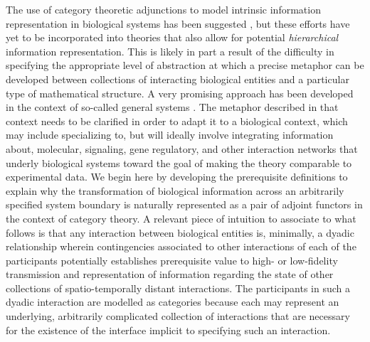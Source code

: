 \documentclass[aps,twocolumn]{revtex4-1}
\begin{document}
The use of category theoretic adjunctions to model intrinsic information representation in biological systems has been suggested \cite{GOGUEN1979,Ellerman2005}, but these efforts have yet to be incorporated into theories that also allow for potential {\it hierarchical} information representation. This is likely in part a result of the difficulty in specifying the appropriate level of abstraction at which a precise metaphor can be developed between collections of interacting biological entities and a particular type of mathematical structure. A very promising approach has been developed in the context of so-called general systems \cite{Zafiris2005a,Zafiris2005b,Zafiris2012}. The metaphor described in that context needs to be clarified in order to adapt it to a biological context, which may include specializing to, but will ideally involve integrating information about, molecular, signaling, gene regulatory, and other interaction networks that underly biological systems toward the goal of making the theory comparable to experimental data. We begin here by developing the prerequisite definitions to explain why the transformation of biological information across an arbitrarily specified system boundary is naturally represented as a pair of adjoint functors in the context of category theory. A relevant piece of intuition to associate to what follows is that any interaction between biological entities is, minimally, a dyadic relationship wherein contingencies associated to other interactions of each of the participants potentially establishes prerequisite value to high- or low-fidelity transmission and representation of information regarding the state of other collections of spatio-temporally distant interactions. The participants in such a dyadic interaction are modelled as categories because each may represent an underlying, arbitrarily complicated collection of interactions that are necessary for the existence of the interface implicit to specifying such an interaction.
\end{document}

